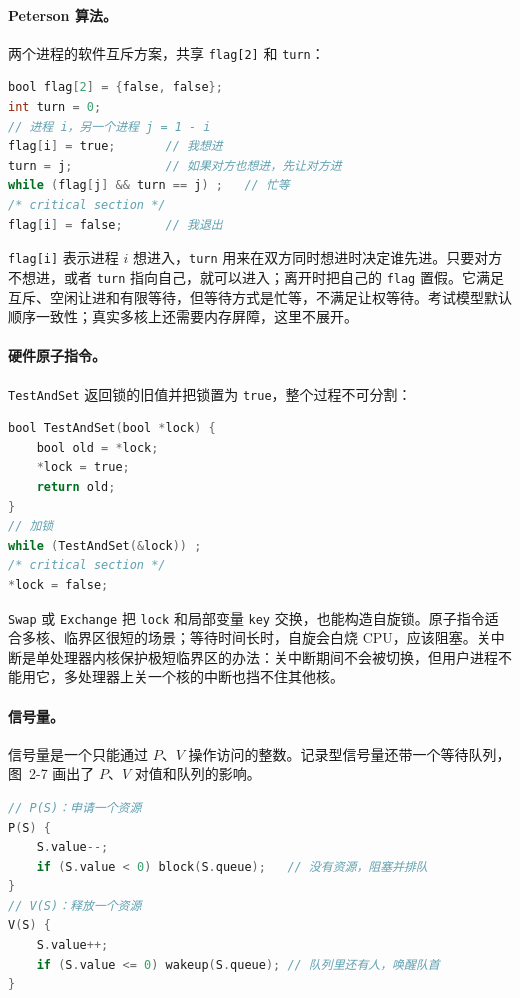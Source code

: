 \paragraph{Peterson 算法。} 两个进程的软件互斥方案，共享 \texttt{flag[2]} 和 \texttt{turn}：

\begin{lstlisting}[language=C]
bool flag[2] = {false, false};
int turn = 0;
// 进程 i，另一个进程 j = 1 - i
flag[i] = true;       // 我想进
turn = j;             // 如果对方也想进，先让对方进
while (flag[j] && turn == j) ;   // 忙等
/* critical section */
flag[i] = false;      // 我退出
\end{lstlisting}

\texttt{flag[i]} 表示进程 $i$ 想进入，\texttt{turn} 用来在双方同时想进时决定谁先进。只要对方不想进，或者 \texttt{turn} 指向自己，就可以进入；离开时把自己的 \texttt{flag} 置假。它满足互斥、空闲让进和有限等待，但等待方式是忙等，不满足让权等待。考试模型默认顺序一致性；真实多核上还需要内存屏障，这里不展开。

\paragraph{硬件原子指令。} \texttt{TestAndSet} 返回锁的旧值并把锁置为 \texttt{true}，整个过程不可分割：

\begin{lstlisting}[language=C]
bool TestAndSet(bool *lock) {
    bool old = *lock;
    *lock = true;
    return old;
}
// 加锁
while (TestAndSet(&lock)) ;
/* critical section */
*lock = false;
\end{lstlisting}

\texttt{Swap} 或 \texttt{Exchange} 把 \texttt{lock} 和局部变量 \texttt{key} 交换，也能构造自旋锁。原子指令适合多核、临界区很短的场景；等待时间长时，自旋会白烧 CPU，应该阻塞。关中断是单处理器内核保护极短临界区的办法：关中断期间不会被切换，但用户进程不能用它，多处理器上关一个核的中断也挡不住其他核。

\paragraph{信号量。} 信号量是一个只能通过 $P$、$V$ 操作访问的整数。记录型信号量还带一个等待队列，图~2-7 画出了 $P$、$V$ 对值和队列的影响。

\begin{lstlisting}[language=C]
// P(S)：申请一个资源
P(S) {
    S.value--;
    if (S.value < 0) block(S.queue);   // 没有资源，阻塞并排队
}
// V(S)：释放一个资源
V(S) {
    S.value++;
    if (S.value <= 0) wakeup(S.queue); // 队列里还有人，唤醒队首
}
\end{lstlisting}

